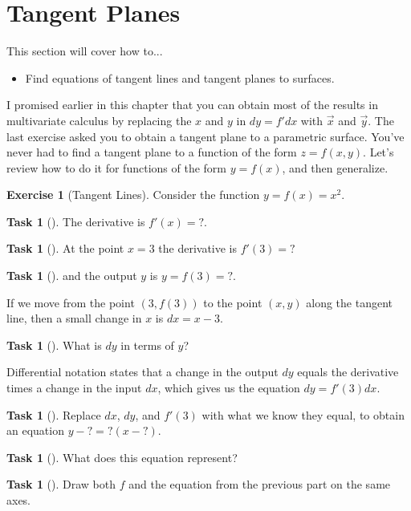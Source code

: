 \documentclass[10pt,]{book}
\theoremstyle{plain}
\theoremstyle{definition}
\theoremstyle{definition}
\theoremstyle{definition}
\theoremstyle{definition}
\newtheorem{exploration}[project]{Exercise}
\newtheorem{task}[project]{Task}
\theoremstyle{definition}
\numberwithin{equation}{section}
\begin{document}
\typeout{************************************************}
\typeout{************************************************}
\section[{Tangent Planes}]{Tangent Planes}\label{section-22}
This section will cover how to... \leavevmode%
\begin{itemize}[label=\textbullet]
\item{}Find equations of tangent lines and tangent planes to surfaces.%
\end{itemize}
%
\par
I promised earlier in this chapter that you can obtain most of the results in multivariate calculus by replacing the \(x\) and \(y\) in \(dy=f'dx\) with \(\vec x\) and \(\vec y\). The last exercise asked you to obtain a tangent plane to a parametric surface. You've never had to find a tangent plane to a function of the form \(z=f(x,y)\). Let's review how to do it for functions of the form \(y=f(x)\), and then generalize.%
\begin{exploration}[Tangent Lines]\label{prob_tangent_line1}
Consider the function \(y=f(x)=x^2\).%
\begin{task}[]\label{task-312}
The derivative is \(f'(x) = ?\).%
\begin{task}[]\label{task-313}
At the point \(x=3\) the derivative is \(f'(3)=?\)%
\end{task}
\begin{task}[]\label{task-314}
and the output \(y\) is \(y=f(3)=?\).%
\end{task}
\end{task}
If we move from the point \((3,f(3))\) to the point \((x,y)\) along the tangent line, then a small change in \(x\) is \(dx=x-3\).%
\begin{task}[]\label{task-315}
What is \(dy\) in terms of \(y\)?%
\end{task}
Differential notation states that a change in the output \(dy\) equals the derivative times a change in the input \(dx\), which gives us the equation \(dy=f'(3)dx\).%
\begin{task}[]\label{task-316}
Replace \(dx\), \(dy\), and \(f'(3)\) with what we know they equal, to obtain an equation \(y-?=?(x-?)\).%
\end{task}
\begin{task}[]\label{task-317}
What does this equation represent?%
\end{task}
\begin{task}[]\label{task-318}
Draw both \(f\) and the equation from the previous part on the same axes.%
\end{task}
\end{exploration}
\end{document}
